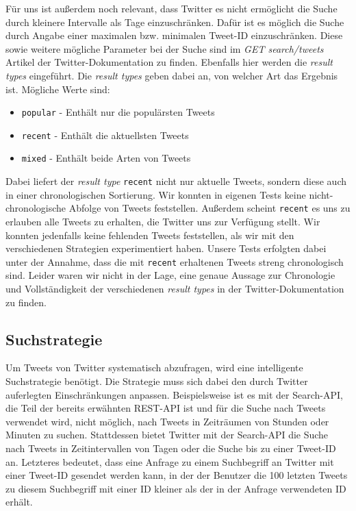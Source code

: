 Für uns ist außerdem noch relevant, dass Twitter es nicht ermöglicht die Suche durch kleinere Intervalle als Tage einzuschränken.
Dafür ist es möglich die Suche durch Angabe einer maximalen bzw. minimalen Tweet-ID einzuschränken.
Diese sowie weitere mögliche Parameter bei der Suche sind im \textit{GET search/tweets} Artikel \cite{TwitterSearch2014} der Twitter-Dokumentation zu finden.
Ebenfalls hier werden die \textit{result types} eingeführt.
Die \textit{result types} geben dabei an, von welcher Art das Ergebnis ist. Mögliche Werte sind:
\begin{itemize}
\item \texttt{popular} - Enthält nur die populärsten Tweets 
\item \texttt{recent} - Enthält die aktuellsten Tweets
\item \texttt{mixed} - Enthält beide Arten von Tweets
\end{itemize}
Dabei liefert der \textit{result type} \texttt{recent} nicht nur aktuelle Tweets, sondern diese auch in einer chronologischen Sortierung.
Wir konnten in eigenen Tests keine nicht-chronologische Abfolge von Tweets feststellen.
Außerdem scheint \texttt{recent} es uns zu erlauben alle Tweets zu erhalten, die Twitter uns zur Verfügung stellt.
Wir konnten jedenfalls keine fehlenden Tweets feststellen, als wir mit den verschiedenen Strategien experimentiert haben. %
Unsere Tests erfolgten dabei unter der Annahme, dass die mit \texttt{recent} erhaltenen Tweets streng chronologisch sind.
Leider waren wir nicht in der Lage, eine genaue Aussage zur Chronologie und Vollständigkeit der verschiedenen \textit{result types} in der Twitter-Dokumentation zu finden.

\subsection{Suchstrategie} %
\label{ssection:Suchstrategie}

Um Tweets von Twitter systematisch abzufragen, wird eine intelligente Suchstrategie benötigt.
Die Strategie muss sich dabei den durch Twitter auferlegten Einschränkungen anpassen.
Beispielsweise ist es mit der Search-API, die Teil der bereits erwähnten REST-API ist und für die Suche nach Tweets verwendet wird, nicht möglich, nach Tweets in Zeiträumen von Stunden oder Minuten zu suchen.
Stattdessen bietet Twitter mit der Search-API die Suche nach Tweets in Zeitintervallen von Tagen oder die Suche bis zu einer Tweet-ID an.
Letzteres bedeutet, dass eine Anfrage zu einem Suchbegriff an Twitter mit einer Tweet-ID gesendet werden kann, in der der Benutzer die 100 letzten Tweets zu diesem Suchbegriff mit einer ID kleiner als der in der Anfrage verwendeten ID erhält.

